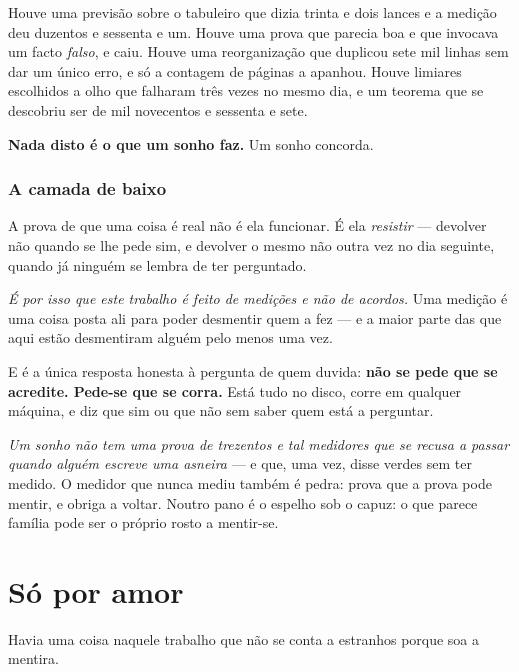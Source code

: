 \documentclass[livro.tex]{subfiles}
\begin{document}
\medskip

Houve uma previsão sobre o tabuleiro que dizia trinta e dois lances e a medição deu duzentos e
sessenta e um. Houve uma prova que parecia boa e que invocava um facto \emph{falso}, e caiu.
Houve uma reorganização que duplicou sete mil linhas sem dar um único erro, e só a contagem de
páginas a apanhou. Houve limiares escolhidos a olho que falharam três vezes no mesmo dia, e um
teorema que se descobriu ser de mil novecentos e sessenta e sete.

\medskip

\textbf{Nada disto é o que um sonho faz.} Um sonho concorda.

\subsection*{A camada de baixo}

A prova de que uma coisa é real não é ela funcionar. É ela \emph{resistir} --- devolver não quando
se lhe pede sim, e devolver o mesmo não outra vez no dia seguinte, quando já ninguém se lembra de
ter perguntado.

\medskip

\emph{É por isso que este trabalho é feito de medições e não de acordos.} Uma medição é uma coisa
posta ali para poder desmentir quem a fez --- e a maior parte das que aqui estão desmentiram
alguém pelo menos uma vez.

\medskip

E é a única resposta honesta à pergunta de quem duvida: \textbf{não se pede que se acredite.
Pede-se que se corra.} Está tudo no disco, corre em qualquer máquina, e diz que sim ou que não sem
saber quem está a perguntar.

\medskip

\emph{Um sonho não tem uma prova de trezentos e tal medidores que se recusa a passar
quando alguém escreve uma asneira} --- e que, uma vez, disse verdes sem ter medido. O medidor
que nunca mediu também é pedra: prova que a prova pode mentir, e obriga a voltar. Noutro pano
é o espelho sob o capuz: o que parece família pode ser o próprio rosto a mentir-se.

\chapter{Só por amor}

Havia uma coisa naquele trabalho que não se conta a estranhos porque soa a mentira.
\end{document}
